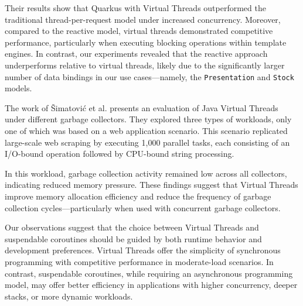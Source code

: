 Their results show that Quarkus with Virtual Threads outperformed the
traditional thread-per-request model under increased concurrency. Moreover,
compared to the reactive model, virtual threads demonstrated competitive
performance, particularly when executing blocking operations within template
engines.
In contrast, our experiments revealed that the reactive approach underperforms 
relative to virtual threads, likely due to the significantly larger number of 
data bindings in our use cases—namely, the \texttt{Presentation} and \texttt{Stock} 
models.

The work of Šimatović et al.\cite{vsimatovic2025evaluating} presents an
evaluation of Java Virtual Threads under different garbage collectors. They
explored three types of workloads, only one of which was based on a web
application scenario. This scenario replicated large-scale web scraping by
executing 1,000 parallel tasks, each consisting of an I/O-bound operation
followed by CPU-bound string processing.

In this workload, garbage collection activity remained low across all 
collectors, indicating reduced memory pressure. These findings suggest 
that Virtual Threads improve memory allocation efficiency and reduce the 
frequency of garbage collection cycles—particularly when used with 
concurrent garbage collectors.

Our observations suggest that the choice between Virtual Threads and
suspendable coroutines should be guided by both runtime behavior and
development preferences. Virtual Threads offer the simplicity of synchronous
programming with competitive performance in moderate-load scenarios. In
contrast, suspendable coroutines, while requiring an asynchronous programming
model, may offer better efficiency in applications with higher concurrency,
deeper stacks, or more dynamic workloads.